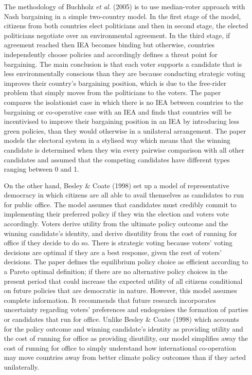 \documentclass[11pt,preprint, authoryear]{elsarticle}
\numberwithin{equation}{section}
\numberwithin{figure}{section}
\numberwithin{table}{section}
\begin{document}
The methodology of Buchholz \emph{et al.} (2005) is to use median-voter
approach with Nash bargaining in a simple two-country model. In the
first stage of the model, citizens from both countries elect politicians
and then in second stage, the elected politicians negotiate over an
environmental agreement. In the third stage, if agreement reached then
IEA becomes binding but otherwise, countries independently choose
policies and accordingly defines a threat point for bargaining. The main
conclusion is that each voter supports a candidate that is less
environmentally conscious than they are because conducting strategic
voting improves their country's bargaining position, which is due to the
free-rider problem that simply moves from the politicians to the voters.
The paper compares the isolationist case in which there is no IEA
between countries to the bargaining or co-operative case with an IEA and
finds that countries will be incentivised to improve their bargaining
position in an IEA by introducing less green policies, than they would
otherwise in a unilateral arrangement. The paper models the electoral
system in a stylised way which means that the winning candidate is
determined when they win every pairwise comparison with all other
candidates and assumed that the competing candidates have different
types ranging between 0 and 1.

On the other hand, Besley \& Coate (1998) set up a model of
representative democracy in which citizens are all able to avail
themselves as candidates to run for public office. The model assumes
that candidates must credibly commit to implementing their preferred
policy if they win the election and voters vote accordingly. Voters
derive utility from the ultimate policy outcome and the winning
candidate's identity, and derive disutility from the cost of running for
office if they decide to do so. There is strategic voting because
voters' voting decisions are optimal if they are a best response, given
the rest of voters' decisions. The paper defines the equilibrium policy
choice as efficient according to a Pareto optimal definition; if there
are no alternative policy choices in the present period that could
increase the expected utility of all citizens conditional on future
policies that are democratic in nature. However, this model assumes
complete information. It recommends that future research incorporates
uncertainty regarding voters' preferences and endogenises the formation
of parties or candidates that run for office. Unlike Besley \& Coate
(1998) which accounts for the policy outcome and winning candidate's
identity as providing utility and the cost of running for office as
providing disutility, our model simplifies away the cost of running for
office to simply understand how international co-operation may move
countries away from better climate policy outcomes than if they acted
unilaterally.
\end{document}
